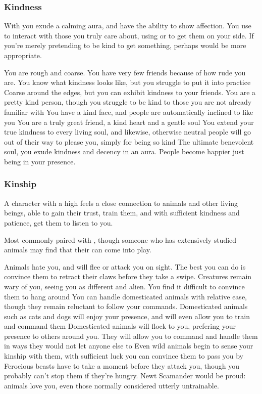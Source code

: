 \subsubsection{Kindness}

With  you exude a calming aura, and have the ability to show affection. You use  to interact with those you truly care about, using  or  to get them on your side. If you're merely pretending to be kind to get something, perhaps  would be more appropriate. 

\ratingTable
{You are rough and coarse. You have very few friends because of how rude you are.}
{You know what kindness looks like, but you struggle to put it into practice}
{Coarse around the edges, but you can exhibit kindness to your friends.}
{You are a pretty kind person, though you struggle to be kind to those you are not already familiar with}
{You have a kind face, and people are automatically inclined to like you}
{You are a truly great friend, a kind heart and a gentle soul}
{You extend your true kindness to every living soul, and likewise, otherwise neutral people will go out of their way to please you, simply for being so kind}
{The ultimate benevolent soul, you exude kindness and decency in an aura. People become happier just being in your presence.}


\subsubsection{Kinship}

A character with a high  feels a close connection to animals and other living beings, able to gain their trust, train them, and with sufficient kindness and patience, get them to listen to you. 

Most commonly paired with , though someone who has extensively studied animals may find that their  can come into play. 

\ratingTable
{Animals hate you, and will flee or attack you on sight. The best you can do is convince them to retract their claws before they take a swipe.}
{Creatures remain wary of you, seeing you as different and alien. You find it difficult to convince them to hang around}
{You can handle domesticated animals with relative ease, though they remain reluctant to follow your commands.}
{Domesticated animals such as cats and dogs will enjoy your presence, and will even allow you to train and command them}
{Domesticated animals will flock to you, prefering your presence to others around you. They will allow you to command and handle them in ways they would not let anyone else to}
{Even wild animals begin to sense your kinship with them, with sufficient luck you can convince them to pass you by}
{Ferocious beasts have to take a moment before they attack you, though you probably can't stop them if they're hungry.}
{Newt Scamander would be proud: animals love you, even those normally considered utterly untrainable.}

